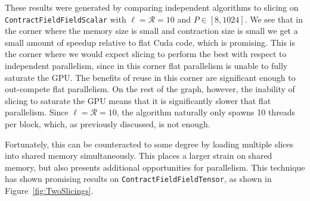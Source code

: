 These results were generated by comparing independent algorithms to slicing on
\texttt{ContractFieldFieldScalar} with $\ell = \mathcal{R} = 10$ and $P \in [8,1024]$. We see
that in the corner where the memory size is small and contraction size is small
we get a small amount of speedup relative to flat Cuda code, which is
promising. This is the corner where we would expect slicing to perform the best
with respect to independent parallelism, since in this corner flat parallelism
is unable to fully saturate the GPU. The benefits of reuse in this corner are
significant enough to out-compete flat parallelism. On the rest of the graph,
however, the inability of slicing to saturate the GPU means that it is
significantly slower that flat parallelism. Since $\ell = \mathcal{R} = 10$,
the algorithm naturally only spawns 10 threads per block, which, as previously discussed, is not enough. 

Fortunately, this can be counteracted to some degree by loading multiple slices 
into shared memory simultaneously. This places a larger strain on shared memory, 
but also presents additional opportunities for parallelism. 
This technique has shown promising results on \texttt{ContractFieldFieldTensor}, as shown in Figure~\ref{fig:TwoSlicings}. 

